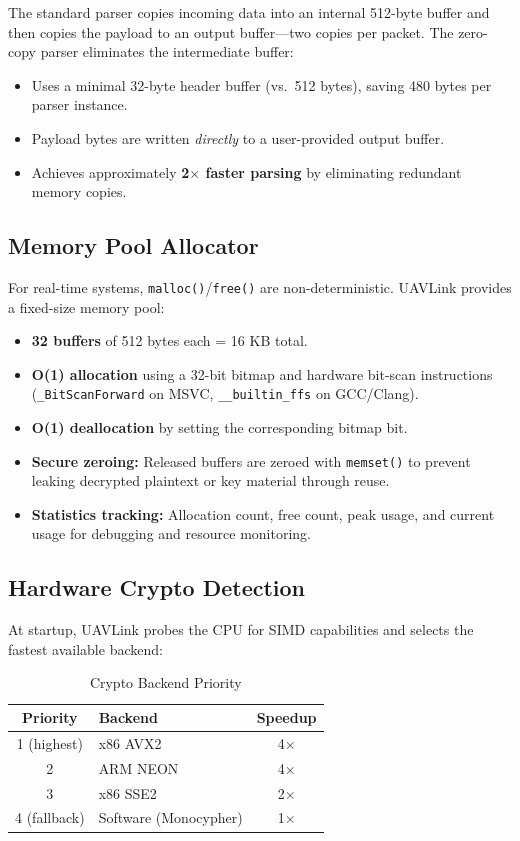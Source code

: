 \documentclass[11pt,a4paper]{article}
\begin{document}
The standard parser copies incoming data into an internal 512-byte buffer and then copies the payload to an output buffer---two copies per packet. The zero-copy parser eliminates the intermediate buffer:

\begin{itemize}[noitemsep]
    \item Uses a minimal 32-byte header buffer (vs.\ 512 bytes), saving 480 bytes per parser instance.
    \item Payload bytes are written \emph{directly} to a user-provided output buffer.
    \item Achieves approximately \textbf{2$\times$ faster parsing} by eliminating redundant memory copies.
\end{itemize}

\subsection{Memory Pool Allocator}

For real-time systems, \texttt{malloc()}/\texttt{free()} are non-deterministic. UAVLink provides a fixed-size memory pool:

\begin{itemize}[noitemsep]
    \item \textbf{32 buffers} of 512 bytes each = 16 KB total.
    \item \textbf{O(1) allocation} using a 32-bit bitmap and hardware bit-scan instructions (\texttt{\_BitScanForward} on MSVC, \texttt{\_\_builtin\_ffs} on GCC/Clang).
    \item \textbf{O(1) deallocation} by setting the corresponding bitmap bit.
    \item \textbf{Secure zeroing:} Released buffers are zeroed with \texttt{memset()} to prevent leaking decrypted plaintext or key material through reuse.
    \item \textbf{Statistics tracking:} Allocation count, free count, peak usage, and current usage for debugging and resource monitoring.
\end{itemize}

\subsection{Hardware Crypto Detection}

At startup, UAVLink probes the CPU for SIMD capabilities and selects the fastest available backend:

\begin{table}[H]
\centering
\begin{tabular}{@{}clc@{}}
\toprule
\textbf{Priority} & \textbf{Backend} & \textbf{Speedup} \\
\midrule
1 (highest) & x86 AVX2         & 4$\times$ \\
2           & ARM NEON         & 4$\times$ \\
3           & x86 SSE2         & 2$\times$ \\
4 (fallback)& Software (Monocypher) & 1$\times$ \\
\bottomrule
\end{tabular}
\caption{Crypto Backend Priority}
\end{table}
\end{document}
